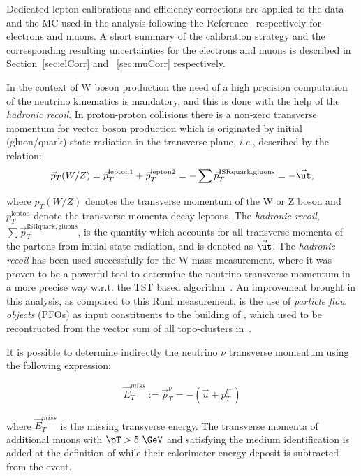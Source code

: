 Dedicated lepton calibrations and efficiency corrections are applied to the data and the MC used in the analysis following the Reference~\cite{Xu:2657152,Sydorenko:2657116} respectively for electrons and muons. A short summary of the calibration strategy and the corresponding resulting uncertainties for the electrons and muons is described in Section~\ref{sec:elCorr} and ~\ref{sec:muCorr} respectively.

In the context of W boson production the need of a high precision computation of the neutrino kinematics is mandatory, and this is done with the help of the \textit{hadronic recoil}. In proton-proton collisions there is a non-zero transverse momentum for vector boson production which is originated by initial (gluon/quark) state radiation in the transverse plane, \textit{i.e.}, described by the relation:
\begin{equation}
\vec{p}_{T}(W/Z)=\vec{p}_{T}^{\mathrm{lepton1}}+\vec{p}_{T}^{\mathrm{lepton2}}=-\sum \vec{p}_{T}^{\mathrm{ISR quark,gluons}} = -\vec{\ut},
\end{equation}

where $p_{T}(W/Z)$ denotes the transverse momentum of the W or Z boson and $p_{T}^{\mathrm{lepton}}$ denote the transverse momenta decay leptons. The  \textit{hadronic recoil}, $\sum \vec{p}_{T}^{\mathrm{ISR quark,gluons}}$,  is the quantity which accounts for all transverse momenta of the partons from initial state radiation, and is denoted as $\vec{\ut}$.
The  \textit{hadronic recoil} has been used successfully for the W mass measurement, where it was proven to be a powerful tool to determine the neutrino transverse momentum in a more precise way w.r.t. the TST based algorithm~\cite{Aaboud:2017svj}. An improvement brought in this analysis, as compared to this RunI measurement, is the use of \emph{particle flow objects} (PFOs) as input constituents to the building of \ut, which used to be recontructed from the vector sum of all topo-clusters in~\cite{Aaboud:2017svj}.

It is possible to determine indirectly the neutrino $\nu$ transverse momentum using the following expression:

\begin{equation}\label{eq:METandNeutrino}
\vec{E}^{miss}_{T}:=\vec{p}_{T}^{\nu}=-(\vec{u}+p_{T} ^{l^{\pm}})
\end{equation}

where $\vec{E}^{miss}_{T}$ is the missing transverse energy. The transverse momenta of additional muons with $\pT>5~\GeV$ and satisfying the medium identification is added at the definition of \MET{} while their calorimeter energy deposit is subtracted from the event.

